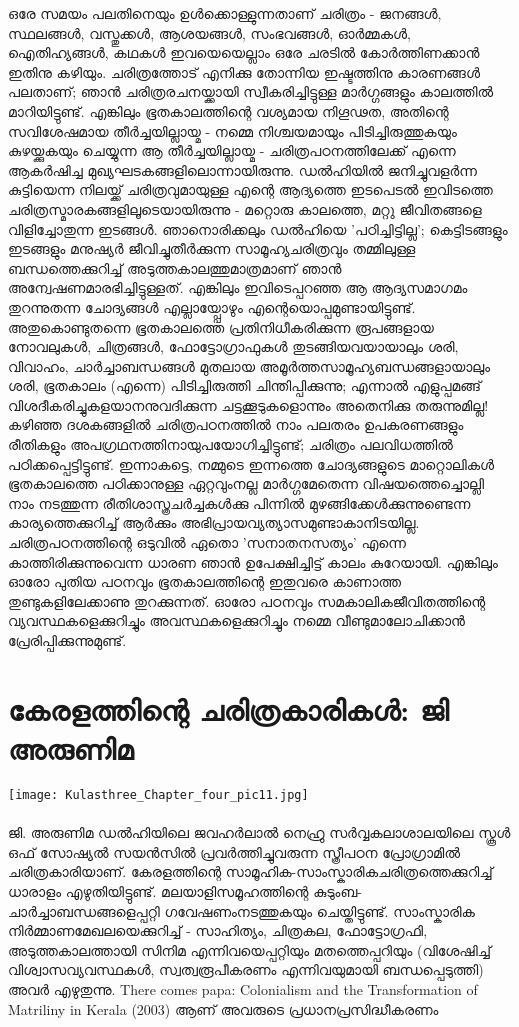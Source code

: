 ഒരേ സമയം പലതിനെയും ഉൾക്കൊള്ളുന്നതാണ് ചരിത്രം - ജനങ്ങൾ, സ്ഥലങ്ങൾ, വസ്തുക്കൾ, ആശയങ്ങൾ, സംഭവങ്ങൾ, ഓർമ്മകൾ, ഐതിഹ്യങ്ങൾ, കഥകൾ ഇവയെയെല്ലാം ഒരേ ചരടിൽ കോർത്തിണക്കാൻ ഇതിനു കഴിയും. ചരിത്രത്തോട് എനിക്കു തോന്നിയ ഇഷ്ടത്തിനു കാരണങ്ങൾ പലതാണ്; ഞാൻ ചരിത്രരചനയ്ക്കായി സ്വീകരിച്ചിട്ടുള്ള മാർഗ്ഗങ്ങളും കാലത്തിൽ മാറിയിട്ടുണ്ട്. എങ്കിലും ഭൂതകാലത്തിന്റെ വശ്യമായ നിഗൂഢത, അതിന്റെ സവിശേഷമായ തീർച്ചയില്ലായ്മ - നമ്മെ നിശ്ചയമായും പിടിച്ചിരുത്തുകയും കുഴയ്ക്കുകയും ചെയ്യുന്ന ആ തീർച്ചയില്ലായ്മ - ചരിത്രപഠനത്തിലേക്ക് എന്നെ ആകർഷിച്ച മുഖ്യഘടകങ്ങളിലൊന്നായിരുന്നു. ഡൽഹിയിൽ ജനിച്ചുവളർന്ന കുട്ടിയെന്ന നിലയ്ക്ക് ചരിത്രവുമായുള്ള എന്റെ ആദ്യത്തെ ഇടപെടൽ ഇവിടത്തെ ചരിത്രസ്മാരകങ്ങളിലൂടെയായിരുന്നു - മറ്റൊരു കാലത്തെ, മറ്റു ജീവിതങ്ങളെ വിളിച്ചോതുന്ന ഇടങ്ങൾ. ഞാനൊരിക്കലും ഡൽഹിയെ 'പഠിച്ചിട്ടില്ല'; കെട്ടിടങ്ങളും ഇടങ്ങളും മനുഷ്യർ ജീവിച്ചുതീർക്കുന്ന സാമൂഹ്യചരിത്രവും തമ്മിലുള്ള ബന്ധത്തെക്കുറിച്ച് അടുത്തകാലത്തുമാത്രമാണ് ഞാൻ അന്വേഷണമാരഭിച്ചിട്ടുള്ളത്. എങ്കിലും ഇവിടെപ്പറഞ്ഞ ആ ആദ്യസമാഗമം തുറന്നുതന്ന ചോദ്യങ്ങൾ എല്ലായ്പ്പോഴും എന്റെയൊപ്പമുണ്ടായിട്ടുണ്ട്. അതുകൊണ്ടുതന്നെ ഭൂതകാലത്തെ പ്രതിനിധീകരിക്കുന്ന രൂപങ്ങളായ നോവലുകൾ, ചിത്രങ്ങൾ, ഫോട്ടോഗ്രാഫുകൾ തുടങ്ങിയവയായാലും ശരി, വിവാഹം, ചാർച്ചാബന്ധങ്ങൾ മുതലായ അമൂർത്തസാമൂഹ്യബന്ധങ്ങളായാലും ശരി, ഭൂതകാലം (എന്നെ) പിടിച്ചിരുത്തി ചിന്തിപ്പിക്കുന്നു; എന്നാൽ എളുപ്പമങ്ങ് വിശദീകരിച്ചുകളയാനനുവദിക്കുന്ന ചട്ടക്കൂടുകളൊന്നും അതെനിക്കു തരുന്നുമില്ല! കഴിഞ്ഞ ദശകങ്ങളിൽ ചരിത്രപഠനത്തിൽ നാം പലതരം ഉപകരണങ്ങളും രീതികളും അപഗ്രഥനത്തിനായുപയോഗിച്ചിട്ടുണ്ട്; ചരിത്രം പലവിധത്തിൽ പഠിക്കപ്പെട്ടിട്ടുണ്ട്. ഇന്നാകട്ടെ, നമ്മുടെ ഇന്നത്തെ ചോദ്യങ്ങളുടെ മാറ്റൊലികൾ ഭൂതകാലത്തെ പഠിക്കാനുള്ള ഏറ്റവുംനല്ല മാർഗ്ഗമേതെന്ന വിഷയത്തെച്ചൊല്ലി നാം നടത്തുന്ന രീതിശാസ്ത്രചർച്ചകൾക്കു പിന്നിൽ മുഴങ്ങിക്കേൾക്കുന്നുണ്ടെന്ന കാര്യത്തെക്കുറിച്ച് ആർക്കും അഭിപ്രായവ്യത്യാസമുണ്ടാകാനിടയില്ല. ചരിത്രപഠനത്തിന്റെ ഒടുവിൽ ഏതൊ 'സനാതനസത്യം' എന്നെ കാത്തിരിക്കുന്നുവെന്ന ധാരണ ഞാൻ ഉപേക്ഷിച്ചിട്ട് കാലം കുറേയായി. എങ്കിലും ഓരോ പുതിയ പഠനവും ഭൂതകാലത്തിന്റെ ഇതുവരെ കാണാത്ത തുണ്ടുകളിലേക്കാണു തുറക്കുന്നത്. ഓരോ പഠനവും സമകാലികജീവിതത്തിന്റെ വ്യവസ്ഥകളെക്കുറിച്ചും അവസ്ഥകളെക്കുറിച്ചും നമ്മെ വീണ്ടുമാലോചിക്കാൻ പ്രേരിപ്പിക്കുന്നുമുണ്ട്. 

\section{കേരളത്തിന്റെ ചരിത്രകാരികൾ: ജി അരുണിമ}
\begin{center}
\texttt{[image: Kulasthree\_Chapter\_four\_pic11.jpg]}
\end{center}
\paragraph{}ജി. അരുണിമ ഡൽഹിയിലെ ജവഹർലാൽ നെഹ്രു സർവ്വകലാശാലയിലെ സ്കൂൾ ഒഫ് സോഷ്യൽ സയൻസിൽ പ്രവർത്തിച്ചുവരുന്ന സ്ത്രീപഠന പ്രോഗ്രാമിൽ ചരിത്രകാരിയാണ്. കേരളത്തിന്റെ സാമൂഹിക-സാംസ്കാരികചരിത്രത്തെക്കുറിച്ച് ധാരാളം എഴുതിയിട്ടുണ്ട്. മലയാളിസമൂഹത്തിന്റെ കുടുംബ-ചാർച്ചാബന്ധങ്ങളെപ്പറ്റി ഗവേഷണംനടത്തുകയും ചെയ്തിട്ടുണ്ട്. സാംസ്കാരിക നിർമ്മാണമേഖലയെക്കുറിച്ച് - സാഹിത്യം, ചിത്രകല, ഫോട്ടോഗ്രഫി, അടുത്തകാലത്തായി സിനിമ എന്നിവയെപ്പറ്റിയും മതത്തെപ്പറിയും (വിശേഷിച്ച് വിശ്വാസവ്യവസ്ഥകൾ, സ്വത്വരൂപീകരണം എന്നിവയുമായി ബന്ധപ്പെടുത്തി) അവർ എഴുതുന്നു. There comes papa: Colonialism and the Transformation of Matriliny in Kerala (2003) ആണ് അവരുടെ പ്രധാനപ്രസിദ്ധീകരണം



